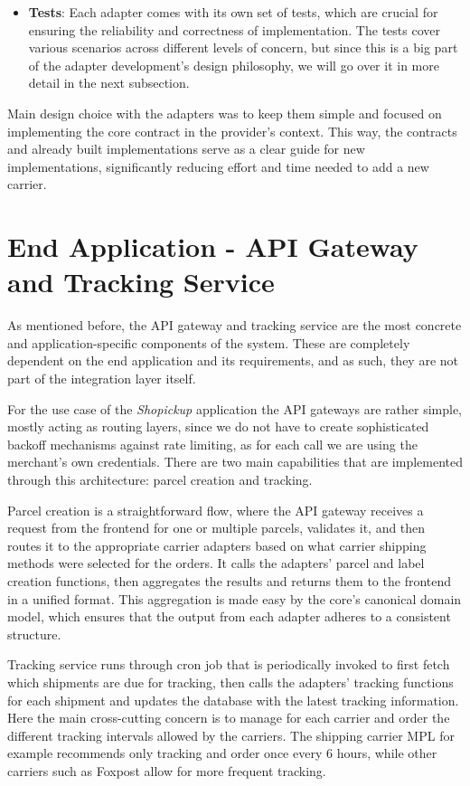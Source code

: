 \documentclass{imc-inf}
\begin{document}
\begin{itemize}[itemsep=3pt]
  \item \textbf{Tests}: Each adapter comes with its own set of tests, which are crucial for ensuring the reliability and correctness of implementation. The tests cover various scenarios across different levels of concern, but since this is a big part of the adapter development's design philosophy, we will go over it in more detail in the next subsection.
\end{itemize}

Main design choice with the adapters was to keep them simple and focused on implementing the core contract in the provider's context.
This way, the contracts and already built implementations serve as a clear guide for new implementations, significantly reducing effort and time needed to add a new carrier.

\section{End Application - API Gateway and Tracking Service}
As mentioned before, the API gateway and tracking service are the most concrete and application-specific components of the system.
These are completely dependent on the end application and its requirements, and as such, they are not part of the integration layer itself.

For the use case of the \textit{Shopickup} application the API gateways are rather simple, mostly acting as routing layers, since we do not have to create sophisticated backoff mechanisms against rate limiting, as for each call we are using the merchant's own credentials.
There are two main capabilities that are implemented through this architecture: parcel creation and tracking.

Parcel creation is a straightforward flow, where the API gateway receives a request from the frontend for one or multiple parcels, validates it, and then routes it to the appropriate carrier adapters based on what carrier shipping methods were selected for the orders.
It calls the adapters' parcel and label creation functions, then aggregates the results and returns them to the frontend in a unified format.
This aggregation is made easy by the core's canonical domain model, which ensures that the output from each adapter adheres to a consistent structure.

Tracking service runs through cron job that is periodically invoked to first fetch which shipments are due for tracking, then calls the adapters' tracking functions for each shipment and updates the database with the latest tracking information.
Here the main cross-cutting concern is to manage for each carrier and order the different tracking intervals allowed by the carriers.
The shipping carrier MPL for example recommends only tracking and order once every 6 hours, while other carriers such as Foxpost allow for more frequent tracking.
\end{document}
